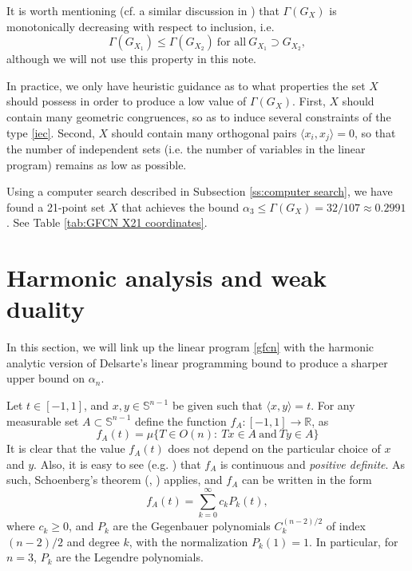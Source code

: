 \documentclass[11pt]{amsart}
\numberwithin{equation}{section}
\newcommand{\Sp}{\mathbb S}
\newcommand{\R}{\mathbb R}
\begin{document}
\medskip

It is worth mentioning (cf. a similar discussion in \cite{mrvz}) that $\Gamma(G_X)$ is monotonically decreasing with respect to inclusion, i.e. 
\begin{equation}\label{mon}
\Gamma(G_{X_1})\le \Gamma(G_{X_2}) \ {\textrm{for all}} \  G_{X_1}\supset G_{X_2},
\end{equation}
although we will not use this property in this note. 

\medskip

In practice, we only have heuristic guidance as to what properties the set $X$ should possess in order to produce a low value of $\Gamma(G_X)$. First, $X$ should contain many geometric congruences, so as to induce several constraints of the type \eqref{iec}. Second, $X$ should contain many orthogonal pairs $\langle x_i, x_j \rangle =0$, so that the number of independent sets (i.e. the number of variables in the linear program) remains as low as possible. 

Using a computer search described in Subsection \ref{ss:computer search}, we have found a 21-point set $X$ that achieves the bound $\alpha_3 \le \Gamma(G_X)=32/107\approx0.2991$. See Table \ref{tab:GFCN X21 coordinates}.

\section{Harmonic analysis and weak duality}
\label{sec3}

In this section, we will link up the linear program \eqref{gfcn}  with the harmonic analytic version of Delsarte's linear programming bound to produce a sharper upper bound on $\alpha_n$. 

\medskip

Let $t\in [-1, 1]$, and $x,y\in \Sp^{n-1}$ be given such that $\langle x, y \rangle =t$. For any measurable set $A\subset \Sp^{n-1}$ define the function $f_A: [-1,1]\to \R$, as 
\begin{equation}\label{fa}
f_A(t)=\mu\{T\in O(n): \  Tx\in A \  {\textrm{and}} \  Ty\in A\}
\end{equation}
It is clear that the value $f_A(t)$ does not depend on the particular choice of $x$ and $y$. Also, it is easy to see (e.g. \cite[Lemma 4]{dp}) that $f_A$ is continuous and {\it positive definite}. As such, Schoenberg's theorem (\cite{sch}, \cite[Theorem 14.3.3]{dx}) applies, and $f_A$ can be written in the form 
\begin{equation}\label{pdf}
f_A(t)=\sum_{k=0}^\infty c_kP_k(t),  
\end{equation}
where $c_k\ge 0$, and $P_k$ are the Gegenbauer polynomials $C^{(n-2)/2}_k$ of index $(n-2)/2$ and degree $k$, with the normalization $P_k(1)=1$. In particular, for $n=3$, $P_k$ are the Legendre polynomials. 
\end{document}
